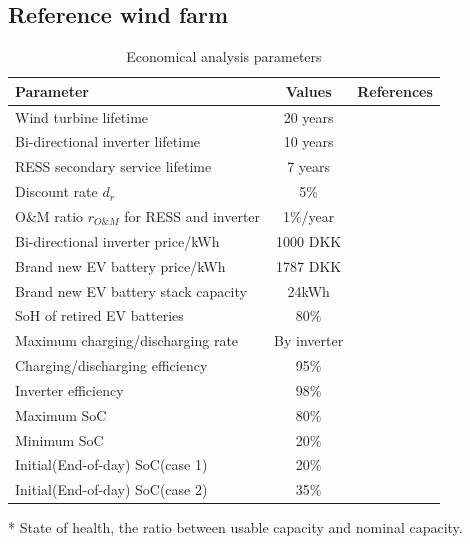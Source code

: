\documentclass[final,5p,times,twocolumn,authoryear]{elsarticle}
\begin{document}
\subsection{Reference wind farm}
\begin {table}[h]
\small
\centering
 \begin{threeparttable}
 \caption{Economical analysis parameters}
 \vspace{5pt}
 \begin{tabular}{lcc}
\hline
\textbf{Parameter}& \textbf{Values}&\textbf{References}\\ 
\hline
Wind turbine lifetime&20 years & \\
Bi-directional inverter lifetime & 10 years& \cite{Hinkle2011}\\
RESS secondary service lifetime & 7 years & \cite{Jiao2018BusinessBatteries, Ambrose2014DrivingBatteries}\\
Discount rate $d_r$& 5\% & \\
O\&M ratio $r_{O\&M}$ for RESS and inverter & 1\%/year & \cite{Zhang2017ComparativeOperation}  \\
Bi-directional inverter price/kWh  & 1000 DKK&\\
Brand new EV battery price/kWh & 1787 DKK & \cite{BNEF2017} \\
Brand new EV battery stack capacity & 24kWh&\\
SoH\tnote{*} of retired EV batteries&80\% & \cite{Abdel-monemLithium-ionKeywords,Zhai2017ModelingMarket,Hu2018OptimizationLoads}\\
Maximum charging/discharging rate & By inverter& \\
Charging/discharging efficiency & 95\% & \cite{Abdel-monemLithium-ionKeywords}\\
Inverter efficiency & 98\% & \cite{Wolfs2015}\\
Maximum SoC&80\%&\\
Minimum SoC&20\%&\\
Initial(End-of-day) SoC(case 1)&20\%&\\
Initial(End-of-day) SoC(case 2)&35\%&\\
\hline
\end{tabular}
        \label{tab:cba}
\begin{tablenotes}
        \footnotesize
        \item[*] State of health, the ratio between usable capacity and nominal capacity.
        \end{tablenotes}
    \end{threeparttable}
\end {table}
\end{document}
